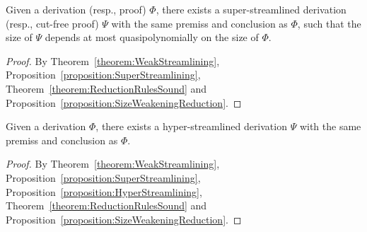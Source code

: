 \begin{corollary}\label{corollary:SuperStreamlining}
Given a derivation (resp., proof)\/ $\Phi$, there exists a super-streamlined derivation (resp., cut-free proof)\/ $\Psi$ with the same premiss and conclusion as\/ $\Phi$, such that the size of\/ $\Psi$ depends at most quasipolynomially on the size of\/ $\Phi$.
\end{corollary}

\begin{proof}
By Theorem~\ref{theorem:WeakStreamlining}, Proposition~\vref{proposition:SuperStreamlining}, Theorem~\vref{theorem:ReductionRulesSound} and Proposition~\vref{proposition:SizeWeakeningReduction}.
\end{proof}

\begin{corollary}\label{corollary:HyperStreamlining}
Given a derivation\/ $\Phi$, there exists a hyper-streamlined derivation\/ $\Psi$ with the same premiss and conclusion as\/ $\Phi$.
\end{corollary}

\begin{proof}
By Theorem~\ref{theorem:WeakStreamlining}, Proposition~\vref{proposition:SuperStreamlining}, Proposition~\vref{proposition:HyperStreamlining}, Theorem~\vref{theorem:ReductionRulesSound} and Proposition~\vref{proposition:SizeWeakeningReduction}.
\end{proof}
